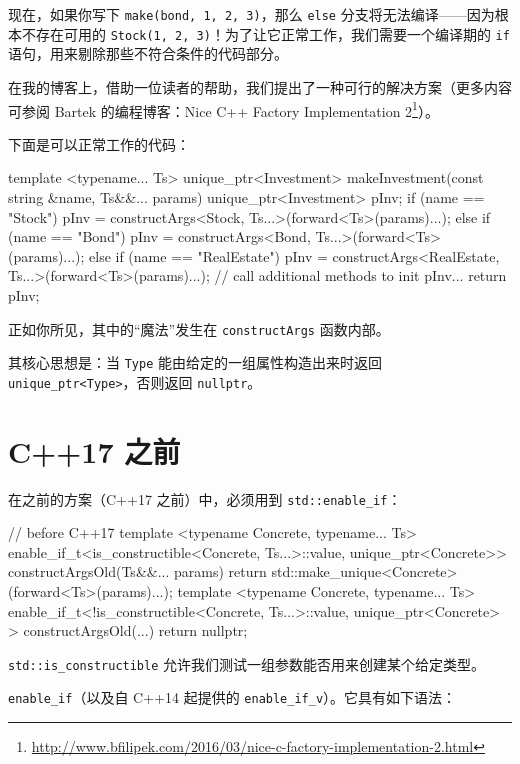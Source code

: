 现在，如果你写下 \texttt{make(bond, 1, 2, 3)}，那么 \texttt{else} 分支将无法编译——因为根本不存在可用的 \texttt{Stock(1, 2, 3)}！为了让它正常工作，我们需要一个编译期的 \texttt{if} 语句，用来剔除那些不符合条件的代码部分。

在我的博客上，借助一位读者的帮助，我们提出了一种可行的解决方案（更多内容可参阅 Bartek 的编程博客：Nice C++ Factory Implementation 2\footnote{\url{http://www.bfilipek.com/2016/03/nice-c-factory-implementation-2.html}}）。

下面是可以正常工作的代码：

\begin{codebox}[cpp]
template <typename... Ts>
unique_ptr<Investment>
makeInvestment(const string &name, Ts&&... params)
{
unique_ptr<Investment> pInv;
if (name == "Stock")
pInv = constructArgs<Stock, Ts...>(forward<Ts>(params)...);
else if (name == "Bond")
pInv = constructArgs<Bond, Ts...>(forward<Ts>(params)...);
else if (name == "RealEstate")
pInv = constructArgs<RealEstate, Ts...>(forward<Ts>(params)...);
// call additional methods to init pInv...
return pInv;
}
\end{codebox}

正如你所见，其中的“魔法”发生在 \texttt{constructArgs} 函数内部。

其核心思想是：当 \texttt{Type} 能由给定的一组属性构造出来时返回 \texttt{unique\_ptr<Type>}，否则返回 \texttt{nullptr}。

\section{C++17 之前}

在之前的方案（C++17 之前）中，必须用到 \texttt{std::enable\_if}：

\begin{codebox}[cpp]
// before C++17
template <typename Concrete, typename... Ts>
enable_if_t<is_constructible<Concrete, Ts...>::value, unique_ptr<Concrete>>
constructArgsOld(Ts&&... params)
{
return std::make_unique<Concrete>(forward<Ts>(params)...);
}
template <typename Concrete, typename... Ts>
enable_if_t<!is_constructible<Concrete, Ts...>::value, unique_ptr<Concrete> >
constructArgsOld(...)
{
return nullptr;
}
\end{codebox}

\texttt{std::is\_constructible} 允许我们测试一组参数能否用来创建某个给定类型。


\texttt{enable\_if}（以及自 C++14 起提供的 \texttt{enable\_if\_v}）。它具有如下语法：

